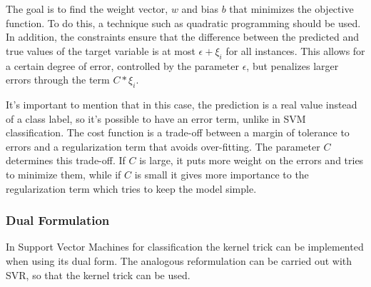 \documentclass[11pt]{article}
\theoremstyle{definition}
\begin{document}
The goal is to find the weight vector, $w$ and bias $b$ that minimizes the objective function. To do this, a technique such as quadratic programming should be used. In addition, the constraints ensure that the difference between the predicted and true values of the target variable is at most $\epsilon + \xi_i$ for all instances. This allows for a certain degree of error, controlled by the parameter $\epsilon$, but penalizes larger errors through the term $C * \xi_i$.

It's important to mention that in this case, the prediction is a real value instead of a class label, so it's possible to have an error term, unlike in SVM classification. The cost function is a trade-off between a margin of tolerance to errors and a regularization term that avoids over-fitting. The parameter $C$ determines this trade-off. If $C$ is large, it puts more weight on the errors and tries to minimize them, while if $C$ is small it gives more importance to the regularization term which tries to keep the model simple.

\subsubsection{Dual Formulation}

In Support Vector Machines for classification the kernel trick can be implemented when using its dual form. The analogous reformulation can be carried out with SVR, so that the kernel trick can be used.
\end{document}
